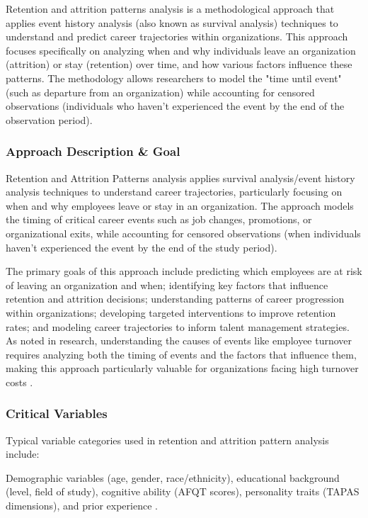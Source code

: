 \documentclass[../main.tex]{subfiles}
\begin{document}
Retention and attrition patterns analysis is a methodological approach that applies event history analysis (also known as survival analysis) techniques to understand and predict career trajectories within organizations. This approach focuses specifically on analyzing when and why individuals leave an organization (attrition) or stay (retention) over time, and how various factors influence these patterns. The methodology allows researchers to model the "time until event" (such as departure from an organization) while accounting for censored observations (individuals who haven't experienced the event by the end of the observation period).

\subsubsection{Approach Description \& Goal}

Retention and Attrition Patterns analysis applies survival analysis/event history analysis techniques to understand career trajectories, particularly focusing on when and why employees leave or stay in an organization. The approach models the timing of critical career events such as job changes, promotions, or organizational exits, while accounting for censored observations (when individuals haven't experienced the event by the end of the study period).

The primary goals of this approach include predicting which employees are at risk of leaving an organization and when; identifying key factors that influence retention and attrition decisions; understanding patterns of career progression within organizations; developing targeted interventions to improve retention rates; and modeling career trajectories to inform talent management strategies. As noted in research, understanding the causes of events like employee turnover requires analyzing both the timing of events and the factors that influence them, making this approach particularly valuable for organizations facing high turnover costs \parencite{allison1982discrete, maas2003use}.

\subsubsection{Critical Variables}

Typical variable categories used in retention and attrition pattern analysis include:

Demographic variables (age, gender, race/ethnicity), educational background (level, field of study), cognitive ability (AFQT scores), personality traits (TAPAS dimensions), and prior experience \parencite{niessen2016attrition}.
\end{document}
